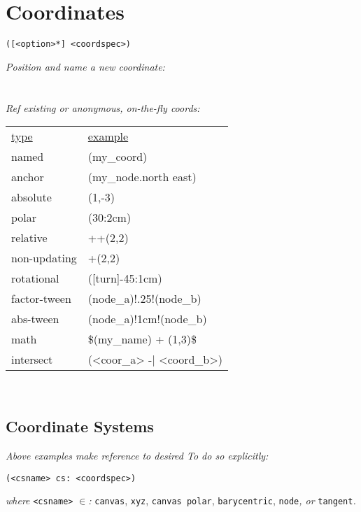 \section{Coordinates}

\begin{lstlisting}
([<option>*] <coordspec>)
\end{lstlisting}

\textit{Position and name a new coordinate:}\\
\\
\\[-1mm]

\textit{Ref existing or anonymous, on-the-fly coords:} \\
\begin{tabularx}{4cm}{l l}
    \underline{type} & \underline{example} \\
    named & (my\_coord) \\
    anchor & (my\_node.north east) \\
    absolute & (1,-3) \\
    polar & (30:2cm) \\
    relative & ++(2,2) \\
    non-updating & +(2,2) \\
    rotational & ([turn]-45:1cm) \\
    factor-tween & (node\_a)!.25!(node\_b) \\
    abs-tween & (node\_a)!1cm!(node\_b) \\
    math & \$(my\_name) + (1,3)\$ \\
    intersect & (<coor\_a> -| <coord\_b>)
\end{tabularx} \ \\



\subsection*{Coordinate Systems}

\textit{Above examples make  reference to desired  To do so explicitly: }
\begin{lstlisting}
(<csname> cs: <coordspec>)
\end{lstlisting}
\textit{where }\texttt{<csname>}\textit{ $\in$: }\texttt{canvas}, \texttt{xyz}, \texttt{canvas polar}, \texttt{barycentric}, \texttt{node}\textit{, or } \texttt{tangent}\textit{.}\\

